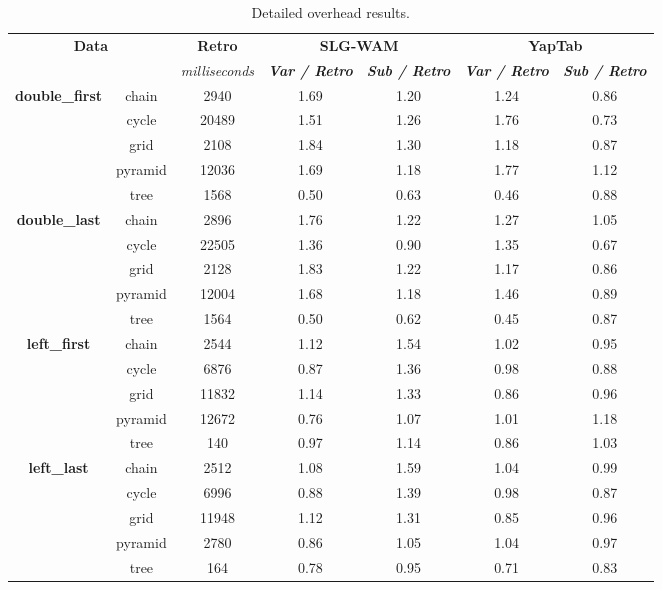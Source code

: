 \begin{table}[ht]
\centering
\footnotesize{
  \begin{tabular}{cc|c|cc|cc}
   \hline
    \hline
    \multicolumn{2}{c|}{\multirow{2}{*}{\small{\textbf{Data}}}} & \textbf{\small{Retro}} & \multicolumn{2}{c|}{\small{\textbf{SLG-WAM}}} & \multicolumn{2}{c}{\small{\textbf{YapTab}}} \\
     \multicolumn{2}{c|}{} & \scriptsize{\textit{milliseconds}} & \textbf{\textit{\scriptsize{Var / Retro}}} & \textbf{\textit{\scriptsize{Sub / Retro}}} & \textbf{\textit{\scriptsize{Var / Retro}}} & \textbf{\textit{\scriptsize{Sub / Retro}}} \\
   \hline
   \hline

\multirow{5}{*}{\textbf{double\_first}} &  chain &  2940 &  1.69  &  1.20  &  1.24 & 0.86 \\
&  cycle &  20489 &  1.51  &  1.26  &  1.76 & 0.73 \\
&  grid &  2108 &  1.84  &  1.30  &  1.18 & 0.87 \\
&  pyramid &  12036 &  1.69  &  1.18  &  1.77 & 1.12 \\
&  tree &  1568 &  0.50  &  0.63  &  0.46 & 0.88 \\
\hline
\multirow{5}{*}{\textbf{double\_last}} &  chain &  2896 &  1.76  &  1.22  &  1.27 & 1.05 \\
&  cycle &  22505 &  1.36  &  0.90  &  1.35 & 0.67 \\
&  grid &  2128 &  1.83  &  1.22  &  1.17 & 0.86 \\
&  pyramid &  12004 &  1.68  &  1.18  &  1.46 & 0.89 \\
&  tree &  1564 &  0.50  &  0.62  &  0.45 & 0.87 \\
\hline
\multirow{5}{*}{\textbf{left\_first}} &  chain &  2544 &  1.12  &  1.54  &  1.02 & 0.95 \\
&  cycle &  6876 &  0.87  &  1.36  &  0.98 & 0.88 \\
&  grid &  11832 &  1.14  &  1.33  &  0.86 & 0.96 \\
&  pyramid &  12672 &  0.76  &  1.07  &  1.01 & 1.18 \\
&  tree &  140 &  0.97  &  1.14  &  0.86 & 1.03 \\
\hline
\multirow{5}{*}{\textbf{left\_last}} &  chain &  2512 &  1.08  &  1.59  &  1.04 & 0.99 \\
&  cycle &  6996 &  0.88  &  1.39  &  0.98 & 0.87 \\
&  grid &  11948 &  1.12  &  1.31  &  0.85 & 0.96 \\
&  pyramid &  2780 &  0.86  &  1.05  &  1.04 & 0.97 \\
&  tree &  164 &  0.78  &  0.95  &  0.71 & 0.83 \\
\hline
\hline
\end{tabular}
}
\caption{Detailed overhead results.}
\label{tbl:overhead_detail_tst1}
\end{table}


